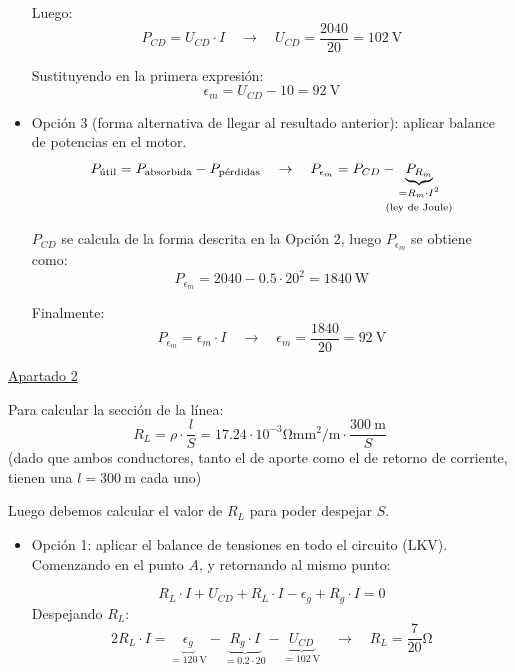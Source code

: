 \begin{example}
\begin{itemize}
    Luego:
    \[
      P_{CD} = U_{CD} \cdot I \quad \rightarrow \quad U_{CD} =
      \frac{2040}{20} = \qty{102}{\volt}
    \]

    Sustituyendo en la primera expresión:
    \[
      \epsilon_m = U_{CD} - 10 = \boxed{ \qty{92}{\volt} }
    \]

  \item Opción 3 (forma alternativa de llegar al resultado anterior):
    aplicar balance de potencias en el motor.
    \[
      P_{\textrm{útil}} = P_{\textrm{absorbida}} -
      P_{\textrm{pérdidas}} \quad \rightarrow \quad P_{\epsilon_m} =
      P_{CD} - \hspace{-3mm} \underbrace{P_{R_m}}_{\substack{= R_m
          \cdot I^2 \\[3pt] \text{(ley de Joule)}}}
    \]
    
    $P_{CD}$ se calcula de la forma descrita en la Opción 2, luego
    $P_{\epsilon_m}$ se obtiene como:
    \[
      P_{\epsilon_m} = 2040 - 0.5 \cdot 20^2 = \qty{1840}{\watt}
    \]

    Finalmente:
    \[
      P_{\epsilon_m} = \epsilon_m \cdot I \quad \rightarrow \quad
      \epsilon_m = \frac{1840}{20} = \boxed{ \qty{92}{\volt} }
    \]
  \end{itemize}

  \vspace{3mm}

  \underline{Apartado 2}

  \vspace{5mm}

  Para calcular la sección de la línea:
  \[
    R_L = \rho \cdot \frac{l}{S} = {17.24 \cdot
      10^{-3}}\si{\ohm\milli\meter\squared\per\meter} \cdot
    \frac{\qty{300}{\meter}}{S}
  \]
  (dado que ambos conductores, tanto el de aporte como el de retorno
  de corriente, tienen una $l=\qty{300}{\meter}$ cada uno)

  \vspace{3mm} Luego debemos calcular el valor de $R_L$ para poder
  despejar $S$.
  \begin{itemize}
  \item Opción 1: aplicar el balance de tensiones en todo el circuito
    (LKV). Comenzando en el punto $A$, y retornando al mismo punto:
    
    \[
      R_L \cdot I + U_{CD} + R_L \cdot I - \epsilon_g + R_g \cdot I =
      0
    \]
    Despejando $R_L$:
    \[
      2 R_L \cdot I = \underbrace{\epsilon_g}_{=\qty{120}{\volt}} -
      \underbrace{R_g \cdot I}_{=0.2 \cdot 20} -
      \underbrace{U_{CD}}_{=\qty{102}{\volt}} \quad \rightarrow \quad
      \boxed{ R_L = {\frac{7}{20}}\si{\ohm} }
    \]


\end{itemize}
\end{example}
